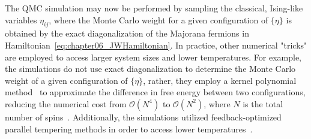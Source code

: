 The QMC simulation may now be performed by sampling the classical, Ising-like variables $\eta_{ij}$, where the Monte Carlo weight for a given configuration of $\{\eta\}$ is obtained by the exact diagonalization of the Majorana fermions in Hamiltonian~\eqref{eq:chapter06_JWHamiltonian}.
In practice, other numerical "tricks" are employed to access larger system sizes and lower temperatures.
For example, the simulations do not use exact diagonalization to determine the Monte Carlo weight of a given configuration of $\{\eta\}$, rather, they employ a kernel polynomial method~\cite{WeisseRMP2006,WeissePRL2009} to approximate the difference in free energy between two configurations, reducing the numerical cost from $\mathcal{O}(N^4)$ to $\mathcal{O}(N^2)$, where $N$ is the total number of spins~\cite{MischenkoPRB2017}.
Additionally, the simulations utilized feedback-optimized parallel tempering methods in order to access lower temperatures~\cite{TrebstPRE2004,KatzgraberJSM2006}.


%
%

